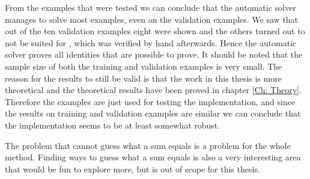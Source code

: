 From the examples that were tested we can conclude that the automatic solver manages to solve most examples, even on the validation examples. We saw that out of the ten validation examples eight were shown and the others turned out to not be suited for \WZ, which was verified by hand afterwards. Hence the automatic solver proves all identities that are possible to prove. It should be noted that the sample size of both the training and validation examples is very small. The reason for the results to still be valid is that the work in this thesis is more theoretical and the theoretical results have been proved in chapter \ref{Ch: Theory}. Therefore the examples are just used for testing the implementation, and since the results on training and validation examples are similar we can conclude that the implementation seems to be at least somewhat robust.

The problem that \WZ cannot guess what a sum equals is a problem for the whole method. Finding ways to guess what a sum equals is also a very interesting area that would be fun to explore more, but is out of scope for this thesis. 
